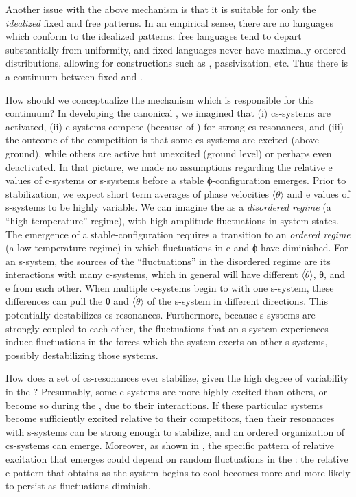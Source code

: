   Another issue with the above mechanism is that it is suitable for only the \textit{idealized} fixed and free  patterns. In an empirical sense, there are no languages which conform to the idealized patterns: free  languages tend to depart substantially from uniformity, and fixed  languages never have maximally ordered distributions, allowing for constructions such as , passivization, etc. Thus there is a continuum between fixed and . 

  How should we conceptualize the mechanism which is responsible for this continuum? In developing the canonical , we imagined that (i) cs-systems are activated, (ii) c-systems compete (because of ) for strong cs-resonances, and (iii) the outcome of the competition is that some cs-systems are excited (above-ground), while others are active but unexcited (ground level) or perhaps even deactivated. In that picture, we made no assumptions regarding the relative e values of c-systems or s-systems before a stable ϕ-configuration emerges. Prior to stabilization, we expect short term averages of phase velocities $\langle\dot{\theta}\rangle$ and e values of s-systems to be highly variable. We can imagine the  as a \textit{disordered regime} (a “high temperature” regime), with high-amplitude fluctuations in system states. The emergence of a stable-configuration requires a transition to an \textit{ordered regime} (a low temperature regime) in which fluctuations in e and ϕ have diminished. For an s-system, the sources of the “fluctuations” in the disordered regime are its interactions with many c-systems, which in general will have different $\langle\dot{\theta}\rangle$, θ, and e from each other. When multiple c-systems begin to  with one s-system, these differences can pull the θ and $\langle\dot{\theta}\rangle$ of the s-system in different directions. This  potentially destabilizes cs-resonances. Furthermore, because s-systems are strongly coupled to each other, the fluctuations that an s-system experiences induce fluctuations in the forces which the system exerts on other s-systems, possibly destabilizing those systems.

  How does a set of cs-resonances ever stabilize, given the high degree of variability in the ? Presumably, some c-systems are more highly excited than others, or become so during the , due to their  interactions. If these particular systems become sufficiently excited relative to their competitors, then their resonances with s-systems can be strong enough to stabilize, and an ordered organization of cs-systems can emerge. Moreover, as shown in {}, the specific pattern of relative excitation that emerges could depend on random fluctuations in the : the relative e-pattern that obtains as the system begins to cool becomes more and more likely to persist as fluctuations diminish.

